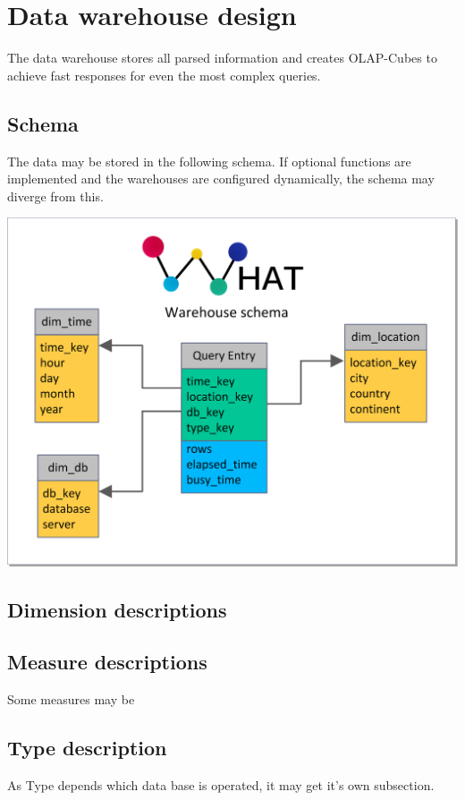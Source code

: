 \section{Data warehouse design}

The data warehouse stores all parsed information and creates OLAP-Cubes to achieve fast responses 
for even the most complex queries.

\subsection{Schema}
The data may be stored in the following schema. If optional functions are implemented and
the warehouses are configured dynamically, the schema may diverge from this.
\begin{center}
\includegraphics[width=1\linewidth]{Pictures/WHSchema2.png}
\end{center}   


\subsection{Dimension descriptions}
 
\subsection{Measure descriptions}
Some measures may be 
\subsection{Type description}
As Type depends which data base is operated, it may get it's own subsection.

  